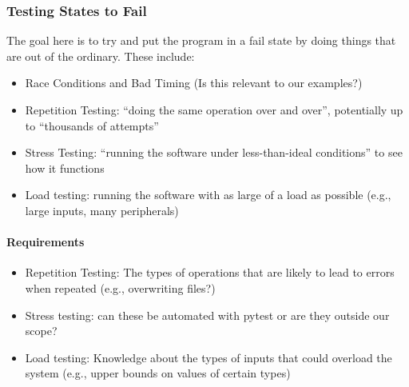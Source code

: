 
\subsubsection[Testing States to Fail]{Testing States to Fail
      \citep[pp.~84-87]{Patton2006}}

The goal here is to try and put the program in a fail state by doing things
that are out of the ordinary. These include:

\begin{itemize}
      \item Race Conditions and Bad Timing \citep[pp.~85-86]{Patton2006}
            (Is this relevant to our examples?)
      \item Repetition Testing: ``doing the same operation over and over'',
            potentially up to ``thousands of attempts''
            \citep[p.~86]{Patton2006}
      \item Stress Testing: ``running the software under less-than-ideal
            conditions'' to see how it functions \citep[p.~86]{Patton2006}
      \item Load testing: running the software with as large of a load as
            possible (e.g., large inputs, many peripherals)
            \citep[p.~86]{Patton2006}
\end{itemize}

\paragraph{Requirements}
\begin{itemize}
      \item Repetition Testing: The types of operations that are likely to lead
            to errors when repeated (e.g., overwriting files?)
      \item Stress testing: can these be automated with pytest or are they
            outside our scope? 
      \item Load testing: Knowledge about the types of inputs that could
            overload the system (e.g., upper bounds on values of certain types)
\end{itemize}

